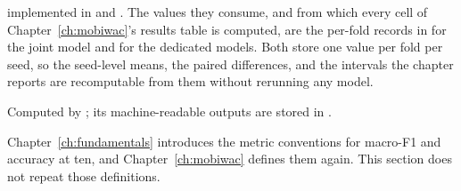 \begin{description}
        implemented in 
        and . The values
        they consume, and from which every cell of Chapter~\ref{ch:mobiwac}'s results table
        is computed, are the per-fold records in
         for the joint model
        and  for the dedicated
        models. Both store one value per fold per seed, so the seed-level means, the paired
        differences, and the intervals the chapter reports are recomputable from them
        without rerunning any model.
  \item[The label-history benchmark.] Computed by
        ; its
        machine-readable outputs are stored in
        .
\end{description}

Chapter~\ref{ch:fundamentals} introduces the metric conventions for macro-F1 and
accuracy at ten, and Chapter~\ref{ch:mobiwac} defines them again. This section does not
repeat those definitions.


